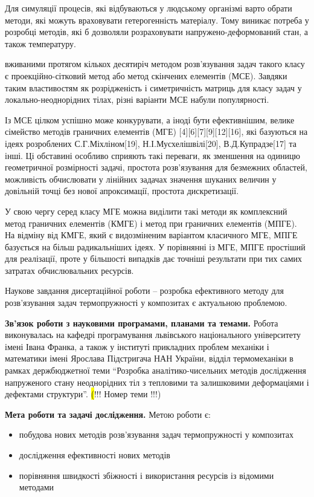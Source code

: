Для симуляції процесів, які відбуваються у людському організмі варто обрати методи, які можуть враховувати
гетерогенність матеріалу. Тому виникає потреба у розробці методів, які б дозволяли розраховувати напружено-деформований
стан, а також температуру.

{ вживаними протягом кількох десятиріч методом розв'язування задач такого класу є проекційно-сітковий
метод або метод скінчених елементів (МСЕ). Завдяки таким властивостям як розрідженість і симетричність матриць для класу
задач у локально-неоднорідних тілах, різні варіанти МСЕ набули популярності.

Із МСЕ цілком успішно може конкурувати, а іноді бути ефективнішим, велике сімейство методів граничних елементів (МГЕ)
\cite{benerdge-et-al} {[}4{]}{[}6{]}{[}7{]}{[}9{]}{[}12{]}{[}16{]}, які базуються на ідеях розроблених
С.Г.Міхліном{[}19{]}, Н.І.Мусхелішвілі{[}20{]}, В.Д.Купрадзе{[}17{]} та інші. Ці обставині особливо сприяють такі
переваги, як зменшення на одиницю геометричної розмірності задачі, простота розв'язування для безмежних областей,
можливість обчислювати у лінійних задачах значення шуканих величин у довільній точці без нової апроксимації, простота
дискретизації.

У свою чергу серед класу МГЕ можна виділити такі методи як комплексний метод граничних елементів (КМГЕ) і метод при
граничних елементів (МПГЕ). На відміну від КМГЕ, який є видозміненим варіантом класичного МГЕ, МПГЕ базується на більш
радикальніших ідеях. У порівнянні із МГЕ, МПГЕ простіший для реалізації, проте у більшості випадків дає точніші
результати при тих самих затратах обчислювальних ресурсів.}

Наукове завдання дисертаційної роботи -- розробка ефективного методу для розв'язування задач термопружності у композитах
є актуальною проблемою.

\textbf{Зв'язок роботи з науковими програмами, планами та темами.} Робота виконувалась на кафедрі програмування
львівського національного університету імені Івана Франка, а також у інституті прикладних проблем механіки і математики
імені Ярослава Підстригача НАН України, відділ термомеханіки в рамках держбюджетної теми ``Розробка аналітико-чисельних
методів дослідження напруженого стану неоднорідних тіл з тепловими та залишковими деформаціями і дефектами структури''.
{\hl(!!! Номер теми !!!)}

\textbf{Мета роботи та задачі дослідження.} Метою роботи є:

\begin{itemize}
\item
  побудова нових методів розв'язування задач термопружності у композитах
\item
  дослідження ефективності нових методів
\item
  порівняння швидкості збіжності і використання ресурсів із відомими методами
\end{itemize}

